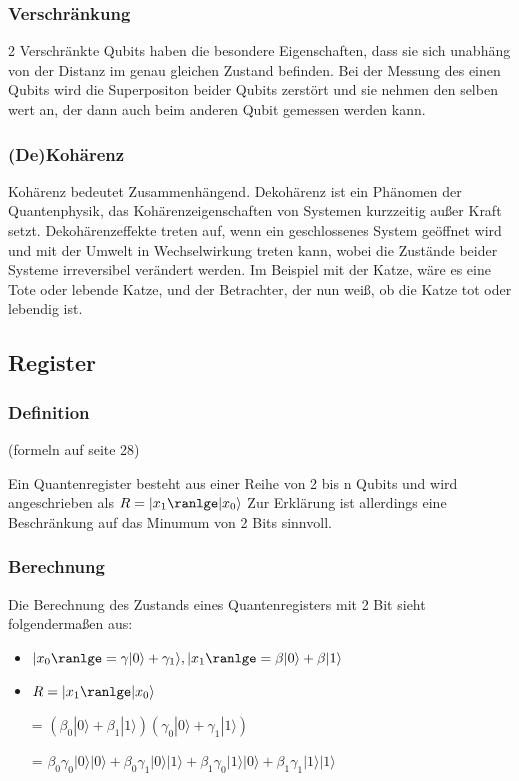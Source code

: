 \subsubsection{Verschränkung}
\label{sec:verschraenkung}

2 Verschränkte Qubits haben die besondere Eigenschaften, dass sie sich unabhäng von der Distanz im genau gleichen Zustand befinden. Bei der Messung des einen Qubits wird die Superpositon beider Qubits zerstört und sie nehmen den selben wert an, der dann auch beim anderen Qubit gemessen werden kann.

\subsubsection{(De)Kohärenz}
\label{sec:koharenz}

Kohärenz bedeutet Zusammenhängend. Dekohärenz ist ein Phänomen der Quantenphysik, das Kohärenzeigenschaften von Systemen kurzzeitig außer Kraft setzt. Dekohärenzeffekte treten auf, wenn ein geschlossenes System geöffnet wird und mit der Umwelt in Wechselwirkung treten kann, wobei die Zustände beider Systeme irreversibel verändert werden.
Im Beispiel mit der Katze, wäre es eine Tote oder lebende Katze, und der Betrachter, der nun weiß, ob die Katze tot oder lebendig ist.

\subsection{Register}
\label{sec:register}

\subsubsection{Definition}
\label{sec:register_definition}
(formeln auf seite 28)

Ein Quantenregister besteht aus einer Reihe von 2 bis n Qubits und wird angeschrieben als $R = |x_1\ranlge|x_0\rangle$
Zur Erklärung ist allerdings eine Beschränkung auf das Minumum von 2 Bits sinnvoll.

\subsubsection{Berechnung}
\label{sec:register_berechnung}

Die Berechnung des Zustands eines Quantenregisters mit 2 Bit sieht folgendermaßen aus:
\begin{itemize}
    \item $|x_0\ranlge = \gamma|0\rangle + \gamma_1\rangle, |x_1\ranlge = \beta|0\rangle + \beta|1\rangle$
    \item $R = |x_1\ranlge|x_0\rangle$
	\item[=] $(\beta_0|0\rangle+\beta_1|1\rangle)(\gamma_0|0\rangle+\gamma_1|1\rangle)$
	\item[=] $\beta_0\gamma_0|0\rangle|0\rangle+\beta_0\gamma_1|0\rangle|1\rangle+\beta_1\gamma_0|1\rangle|0\rangle+\beta_1\gamma_1|1\rangle|1\rangle$
\end{itemize}

